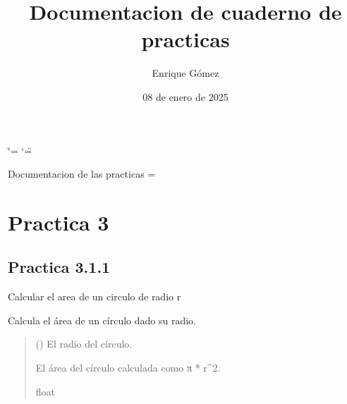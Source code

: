 \documentclass[letterpaper,10pt,spanish]{sphinxmanual}
\title{Documentacion de cuaderno de practicas}
\date{08 de enero de 2025}
\author{Enrique Gómez}
\begin{document}
\ifdefined\shorthandoff
  \ifnum\catcode`\=\string=\active\shorthandoff{=}\fi
  \ifnum\catcode`\"=\active{}\fi
\fi

\pagestyle{empty}
\sphinxmaketitle
\pagestyle{plain}
\sphinxtableofcontents
\pagestyle{normal}
\label{\detokenize{index::doc}}


\sphinxstepscope

\sphinxAtStartPar
Documentacion de las practicas
=

\sphinxstepscope


\chapter{Practica 3}
\label{\detokenize{pr3:practica-3}}\label{\detokenize{pr3::doc}}\label{\detokenize{pr3::doc}}

\section{Practica 3.1.1}
\label{\detokenize{pr3:module-pr3.1_1}}\label{\detokenize{pr3:practica-3-1-1}}
\sphinxAtStartPar
Calcular el area de un circulo de radio r

\begin{fulllineitems}
\label{\detokenize{pr3:pr3.1_1.area_circulo}}
\pysigstartsignatures
{}
\pysigstopsignatures
\sphinxAtStartPar
Calcula el área de un círculo dado su radio.
\begin{quote}\begin{description}
\sphinxAtStartPar
{} () \textendash{} El radio del círculo.

\sphinxAtStartPar
El área del círculo calculada como π * r\textasciicircum{}2.

\sphinxAtStartPar
float

\end{description}\end{quote}

\end{fulllineitems}
\end{document}
